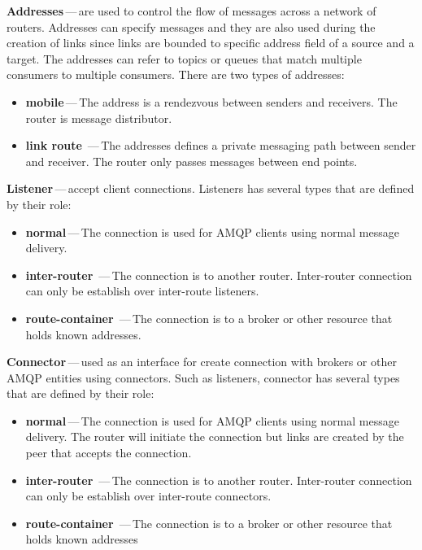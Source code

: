 \begin{description}
	\setlength\itemsep{0em}
	\item \textbf{Addresses\footnotemark}\,---\,are used to control the flow of messages across a network of routers. Addresses can specify messages and they are also used during the creation of links since links are bounded to specific address field of a source and a target. The addresses can refer to topics or queues that match multiple consumers to multiple consumers. There are two types of addresses:
	\begin{itemize}
		\setlength\itemsep{0em}
		\item \textbf{mobile}\,---\,The address is a rendezvous between senders and receivers. The router is message distributor.
		\item \textbf{link route}	\,---\,The addresses defines a private messaging path between sender and receiver. The router only passes messages between end points.
	\end{itemize}	
	\item \textbf{Listener}\,---\,accept client connections. Listeners has several types that are defined by their role:
	\begin{itemize}
		\setlength\itemsep{0em}
		\item \textbf{normal}\,---\,The connection is used for AMQP clients using normal message delivery.
		\item \textbf{inter-router}	\,---\,The connection is to another router. Inter-router connection can only be establish over inter-route listeners.
		\item \textbf{route-container}	\,---\,The connection is to a broker or other resource that holds known addresses.
	\end{itemize}
	\item \textbf{Connector}\,---\,used as an interface for create connection with brokers or other AMQP entities using connectors. Such as listeners, connector has several types that are defined by their role:
	\begin{itemize}
		\setlength\itemsep{0em}
		\item \textbf{normal}\,---\,The connection is used for AMQP clients using normal message delivery. The router will initiate the connection but links are created by the peer that accepts the connection.
		\item \textbf{inter-router}	\,---\,The connection is to another router. Inter-router connection can only be establish over inter-route connectors.
		\item \textbf{route-container}	\,---\,The connection is to a broker or other resource that holds known addresses
	\end{itemize}	
\end{description}

